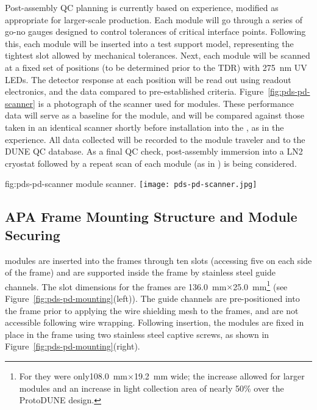 Post-assembly QC planning is currently based on  experience, modified as appropriate for larger-scale production.  Each module will go through a series of go-no gauges designed to control tolerances of critical interface points.  Following this, each module will be inserted into a test  support model, representing the tightest slot allowed by  mechanical tolerances. Next, each module will be scanned at a fixed set of positions (to be determined prior to the TDR) with \SI{275}{nm} UV LEDs.  The detector response at each position will be read out using  readout electronics, and the data compared to pre-established criteria.  Figure~\ref{fig:pds-pd-scanner} is a photograph of the scanner used for  modules. These performance data will serve as a baseline for the module, and will be compared against those taken in an identical scanner shortly before installation into the , as in the  experience.  All data collected will be recorded to the module traveler and to the DUNE QC database.
As a final QC check, post-assembly immersion into a LN2 cryostat followed by a repeat scan of each  module (as in ) is being considered.

\begin{dunefigure}{fig:pds-pd-scanner}
{ module scanner.}
  \texttt{[image: pds-pd-scanner.jpg]}
\end{dunefigure}


\subsection{APA Frame Mounting Structure and Module Securing}	
\label{sec:fdsp-pd-assy-frames}

 modules are inserted into the  frames through ten slots 
(accessing five on each side of the  frame) and are supported inside the frame by 
stainless steel guide channels.  The slot dimensions for the   frames 
are \SI{136.0}{mm}$\times$\SI{25.0}{mm}\footnote{For  they were only\SI{108.0}{mm}$\times$\SI{19.2}{mm} wide; the increase allowed for larger  modules and an increase in light collection area of nearly 50\% over the ProtoDUNE design.}   
(see Figure~\ref{fig:pds-pd-mounting}(left)).
The guide channels are pre-positioned into the  frame prior to applying the wire shielding mesh to the  frames, and are not accessible following wire wrapping. Following insertion, the  modules are fixed in place in the  frame using two stainless steel captive screws, as shown in Figure~\ref{fig:pds-pd-mounting}(right).
 
